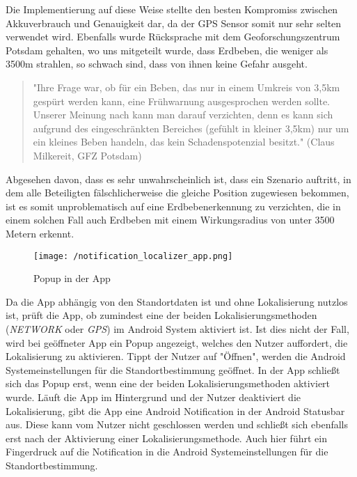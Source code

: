 Die Implementierung auf diese Weise stellte den besten Kompromiss zwischen Akkuverbrauch und Genauigkeit dar, da der GPS Sensor somit nur sehr selten verwendet wird. Ebenfalls wurde Rücksprache mit dem Geoforschungszentrum Potsdam gehalten, wo uns mitgeteilt wurde, dass Erdbeben, die weniger als 3500m strahlen, so schwach sind, dass von ihnen keine Gefahr ausgeht. 
\par\bigskip
\begin{quote}
"Ihre Frage war, ob für ein Beben, das nur in einem Umkreis von 3,5km gespürt werden kann, eine Frühwarnung ausgesprochen werden sollte. Unserer Meinung nach kann man darauf verzichten, denn es kann sich aufgrund des eingeschränkten Bereiches (gefühlt in kleiner 3,5km) nur um ein kleines Beben handeln, das kein Schadenspotenzial besitzt."\newline
(Claus Milkereit, GFZ Potsdam)
\end{quote}
\par\bigskip
Abgesehen davon, dass es sehr unwahrscheinlich ist, dass ein Szenario auftritt, in dem alle Beteiligten fälschlicherweise die gleiche Position zugewiesen bekommen, ist es somit unproblematisch auf eine Erdbebenerkennung zu verzichten, die in einem solchen Fall auch Erdbeben mit einem Wirkungsradius von unter 3500 Metern erkennt. 

\par\bigskip\bigskip\bigskip
\begin{wrapfigure}{r}{50mm}
	\centering
	\vspace{-15mm}
    \texttt{[image: /notification\_localizer\_app.png]}
    \vspace*{-10mm}
    \caption[Lokalisierung: deaktivierte Provider - Popup in der App]{Popup in der App}
    \vspace*{-30mm}
\end{wrapfigure}

\par
Da die App abhängig von den Standortdaten ist und ohne Lokalisierung nutzlos ist, prüft die App, ob zumindest eine der beiden Lokalisierungsmethoden (\textit{NETWORK} oder \textit{GPS}) im Android System aktiviert ist. Ist dies nicht der Fall, wird bei geöffneter App ein Popup angezeigt, welches den Nutzer auffordert, die  Lokalisierung zu aktivieren. Tippt der Nutzer auf "Öffnen", werden die Android Systemeinstellungen für die Standortbestimmung geöffnet. In der App schließt sich das Popup erst, wenn eine der beiden Lokalisierungsmethoden aktiviert wurde. 
\newpage
Läuft die App im Hintergrund und der Nutzer deaktiviert die Lokalisierung, gibt die App eine Android Notification in der Android Statusbar aus. Diese kann vom Nutzer nicht geschlossen werden und schließt sich ebenfalls erst nach der Aktivierung einer Lokalisierungsmethode. Auch hier führt ein Fingerdruck auf die Notification in die Android Systemeinstellungen für die Standortbestimmung.


